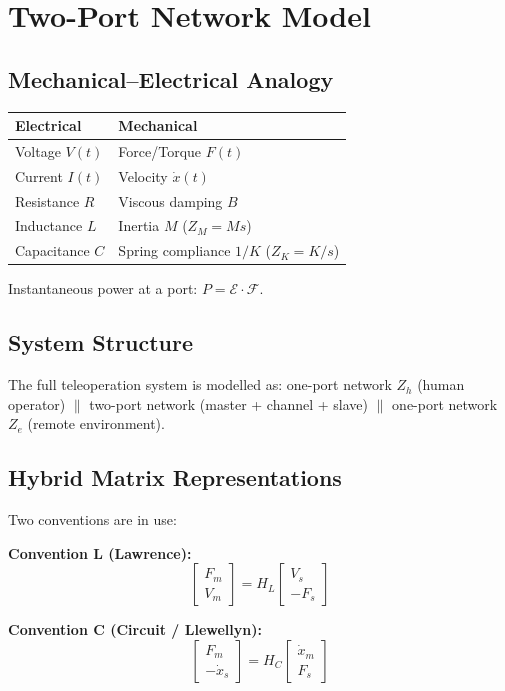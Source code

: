 \documentclass[11pt,a4paper,twoside]{report}
\begin{document}
\section{Two-Port Network Model}
\subsection{Mechanical–Electrical Analogy}
\begin{center}
\begin{tabular}{ll}
\hline
\textbf{Electrical} & \textbf{Mechanical} \\
\hline
Voltage $V(t)$ & Force/Torque $F(t)$ \\
Current $I(t)$ & Velocity $\dot{x}(t)$ \\
Resistance $R$ & Viscous damping $B$ \\
Inductance $L$ & Inertia $M$ ($Z_M = Ms$) \\
Capacitance $C$ & Spring compliance $1/K$ ($Z_K = K/s$) \\
\hline
\end{tabular}
\end{center}
Instantaneous power at a port: $P = \mathcal{E} \cdot \mathcal{F}$.

\subsection{System Structure}
The full teleoperation system is modelled as: one-port network $Z_h$ (human operator) $\|$ two-port network (master + channel + slave) $\|$ one-port network $Z_e$ (remote environment).

\subsection{Hybrid Matrix Representations}
Two conventions are in use:

\textbf{Convention L (Lawrence):}
\begin{equation}
    \begin{bmatrix} F_m \\ V_m \end{bmatrix} = H_L \begin{bmatrix} V_s \\ -F_s \end{bmatrix}
\end{equation}

\textbf{Convention C (Circuit / Llewellyn):}
\begin{equation}
    \begin{bmatrix} F_m \\ -\dot{x}_s \end{bmatrix} = H_C \begin{bmatrix} \dot{x}_m \\ F_s \end{bmatrix}
\end{equation}
\end{document}
